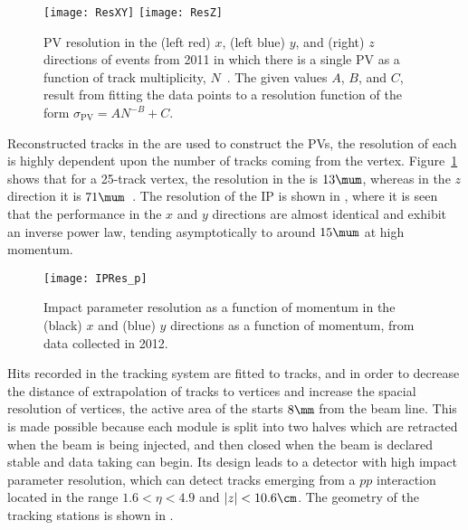 \begin{figure}
  \begin{center}
    \texttt{[image: ResXY]}
    \texttt{[image: ResZ]}
    \caption[PV resolution as a function of track multiplicity]{
      PV resolution in the (left red) $x$, (left blue) $y$, and (right) $z$ directions
      of events from 2011 in which there is a single PV as a function of track multiplicity,
      $N$~\protect\cite{LHCb-DP-2014-001}.
      The given values $A$, $B$, and $C$, result from fitting the data points to a resolution
      function of the form $\sigma_\mathrm{PV} = AN^{-B} + C$.
    }
    \label{fig:velo:pvres}
  \end{center}
\end{figure}

Reconstructed tracks in the \velo are used to construct the PVs,
the resolution of each \pv is highly dependent upon the number of tracks coming from the vertex.
Figure~\ref{fig:velo:pvres} shows that for a
25-track vertex, the resolution in the  is
$13\mum$, whereas in the $z$ direction it is $71\mum$~\cite{LHCb-DP-2014-001}.
The resolution of the \gls{IP} is shown in , where it is
seen that the performance in the $x$ and $y$ directions are almost identical and exhibit an
inverse power law, tending asymptotically to around $15\mum$ at high momentum.

\begin{figure}
  \begin{center}
    \texttt{[image: IPRes\_p]}
    \caption[IP resolution as a function of momentum]{
      Impact parameter resolution as a function of momentum in the (black) $x$ and (blue) $y$
      directions as a function of momentum, from data collected in 2012.
    }
    \label{fig:velo:ipres}
  \end{center}
\end{figure}

Hits recorded in the tracking system are fitted to tracks, and in order to decrease the
distance of extrapolation of tracks to vertices and increase the spacial resolution of vertices,
the active area of the \velo starts $8\mm$ from the beam line.
This is made possible because each module is split into two halves which are retracted when the
\lhc beam is being injected, and then closed when the beam is declared stable and data taking can
begin.
Its design leads to a detector with high impact parameter resolution, which can detect tracks
emerging from a $pp$ interaction located in the range $1.6<\eta<4.9$ and $|z|<10.6\cm$.
The geometry of the tracking stations is shown in .


